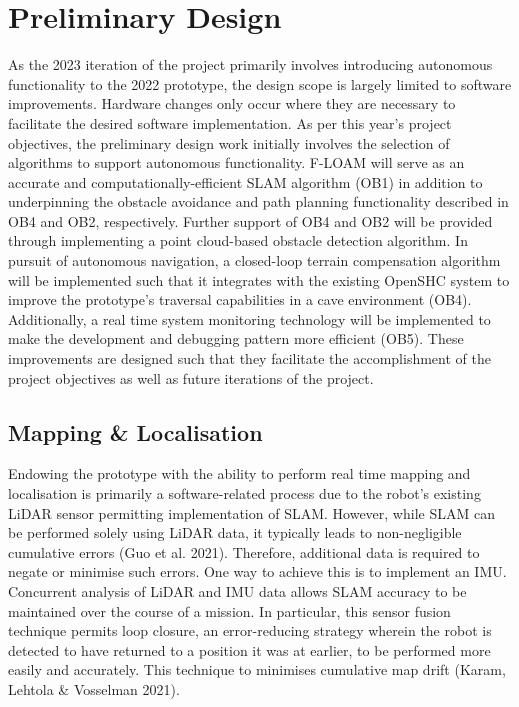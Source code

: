 \section{Preliminary Design}
\label{sec:prelim-design}
As the 2023 iteration of the project primarily involves introducing autonomous functionality to the 2022 prototype, the design scope is largely limited to software improvements. Hardware changes only occur where they are necessary to facilitate the desired software implementation. As per this year's project objectives, the preliminary design work initially involves the selection of algorithms to support autonomous functionality. F-LOAM will serve as an accurate and computationally-efficient SLAM algorithm (OB1) in addition to underpinning the obstacle avoidance and path planning functionality described in OB4 and OB2, respectively. Further support of OB4 and OB2 will be provided through implementing a point cloud-based obstacle detection algorithm. In pursuit of autonomous navigation, a closed-loop terrain compensation algorithm will be implemented such that it integrates with the existing OpenSHC system to improve the prototype's traversal capabilities in a cave environment (OB4). Additionally, a real time system monitoring technology will be implemented to make the development and debugging pattern more efficient (OB5). These improvements are designed such that they facilitate the accomplishment of the project objectives as well as future iterations of the project.

\subsection{Mapping \& Localisation}
Endowing the prototype with the ability to perform real time mapping and localisation is primarily a software-related process due to the robot's existing LiDAR sensor permitting implementation of SLAM. However, while SLAM can be performed solely using LiDAR data, it typically leads to non-negligible cumulative errors (Guo et al. 2021). Therefore, additional data is required to negate or minimise such errors. One way to achieve this is to implement an IMU. Concurrent analysis of LiDAR and IMU data allows SLAM accuracy to be maintained over the course of a mission. In particular, this sensor fusion technique permits loop closure, an error-reducing strategy wherein the robot is detected to have returned to a position it was at earlier, to be performed more easily and accurately. This technique to minimises cumulative map drift (Karam, Lehtola \& Vosselman 2021).

